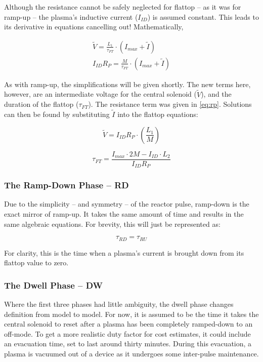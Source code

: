 Although the resistance cannot be safely neglected for flattop -- as it was for ramp-up -- the plasma's inductive current ($I_{ID}$) is assumed constant. This leads to its derivative in equations cancelling out! Mathematically,

\begin{align}
	\tilde V = \frac{L_1}{\tau_{FT}} \cdot \left( I_{max} + \tilde I \right) \\
	I_{ID} R_P = \frac{M}{\tau_{FT}} \cdot \left( I_{max} + \tilde I \right)
\end{align}

As with ramp-up, the simplifications will be given shortly. The new terms here, however, are an intermediate voltage for the central solenoid ($\tilde V$), and the duration of the flattop ($\tau_{FT}$). The resistance term was given in \cref{eq:rp}. Solutions can then be found by substituting $\tilde I$ into the flattop equations:

\begin{equation}
	\tilde V = I_{ID} R_P \cdot \left( \frac{L_1}{M} \right)	
\end{equation}

\begin{equation}
	\label{eq:tauft}
	\tau_{FT} = \frac{ I_{max} \cdot 2 M - I_{ID} \cdot  L_2 }{I_{ID} R_P}
\end{equation}

\subsubsection{The Ramp-Down Phase -- RD}

Due to the simplicity -- and symmetry -- of the reactor pulse, ramp-down is the exact mirror of ramp-up. It takes the same amount of time and results in the same algebraic equations. For brevity, this will just be represented as:

\begin{equation}
	\label{eq:taurd}
	\tau_{RD} = \tau_{RU}
\end{equation}

For clarity, this is the time when a plasma's current is brought down from its flattop value to zero.

\subsubsection{The Dwell Phase -- DW}

Where the first three phases had little ambiguity, the dwell phase changes definition from model to model. For now, it is assumed to be the time it takes the central solenoid to reset after a plasma has been completely ramped-down to an off-mode. To get a more realistic duty factor for cost estimates, it could include an evacuation time, set to last around thirty minutes. During this evacuation, a plasma is vacuumed out of a device as it undergoes some inter-pulse maintenance.

